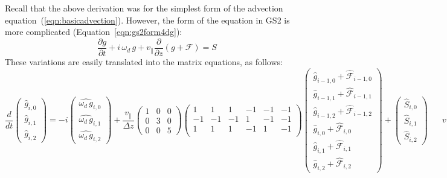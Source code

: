 \documentclass[10pt,a4paper]{article}
\newcommand{\dd}{\partial}
\begin{document}
Recall that the above derivation was for the simplest form of the advection
equation~(\ref{eqn:basicadvection}). However, the form of the equation in GS2
is more complicated (Equation~\ref{eqn:gs2form4dg}):
\[
\frac{\dd g}{\dd t} + i \, \omega_d \, g + v_\parallel \frac{\dd}{\dd z} (g+\mathcal{F})
  = S
\]
These variations are easily translated into the matrix equations, as follows:
\footnotesize
\begin{equation} \boxed{
\frac{d}{dt} \left( \begin{array}{c}
\hat{g}_{i,0} \\ \hat{g}_{i,1} \\ \hat{g}_{i,2}
\end{array} \right)
=
-i \left( \begin{array}{c}
\widehat{\omega_d\,g}_{i,0} \\ \widehat{\omega_d\,g}_{i,1} \\ \widehat{\omega_d\,g}_{i,2}
\end{array} \right)
+ \frac{v_\parallel}{\Delta z} \left(
\begin{array}{ccc}
1 & 0 & 0 \\
0 & 3 & 0 \\
0 & 0 & 5
\end{array} \right)
\left(
\begin{array}{rrrrrr}
1 & 1 & 1 & -1 & -1 & -1 \\
-1 & -1 & -1 & 1 & -1 & -1 \\
1 & 1 & 1 & -1 & 1 & -1 \\
\end{array} \right)
\left( \begin{array}{c}
\hat{g}_{i-1,0} + \hat{\mathcal{F}}_{i-1,0} \\
\hat{g}_{i-1,1} + \hat{\mathcal{F}}_{i-1,1} \\
\hat{g}_{i-1,2} + \hat{\mathcal{F}}_{i-1,2} \\
\hat{g}_{i,0} + \hat{\mathcal{F}}_{i,0} \\
\hat{g}_{i,1} + \hat{\mathcal{F}}_{i,1} \\
\hat{g}_{i,2} + \hat{\mathcal{F}}_{i,2}
\end{array} \right)
+ \left( \begin{array}{c}
\hat{S}_{i,0} \\ \hat{S}_{i,1} \\ \hat{S}_{i,2}
\end{array} \right)
} \;\;\;\;\;\; v_\parallel \geq 0
\label{eqn:vplus}
\end{equation}
\end{document}
